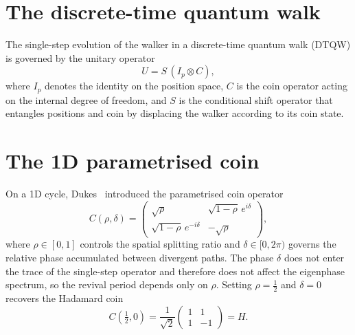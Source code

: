 
\section{The discrete-time quantum walk}
The single-step evolution of the walker in a discrete-time quantum walk
(DTQW) is governed by the unitary operator
\begin{equation}
  U = S\,(I_p \otimes C),
  \label{eq:general-evolution}
\end{equation}
where $I_p$ denotes the identity on the position space, $C$ is the coin
operator acting on the internal degree of freedom, and $S$ is the conditional
shift operator that entangles positions and coin by displacing the walker
according to its coin state.

\section{The 1D parametrised coin}
On a 1D cycle, Dukes~\cite{Dukes2014} introduced the parametrised coin
operator
\begin{equation}
  C(\rho,\delta) =
  \begin{pmatrix}
    \sqrt{\rho} & \sqrt{1-\rho}\,e^{i\delta} \\
    \sqrt{1-\rho}\,e^{-i\delta} & -\sqrt{\rho}
  \end{pmatrix},
  \label{eq:1d-coin}
\end{equation}
where $\rho \in [0,1]$ controls the spatial splitting ratio and
$\delta \in [0, 2\pi)$ governs the relative phase accumulated between
divergent paths. The phase $\delta$ does not enter the trace of the
single-step operator and therefore does not affect the eigenphase
spectrum, so the revival period depends only on $\rho$. Setting
$\rho = \tfrac{1}{2}$ and $\delta = 0$ recovers the Hadamard coin
\begin{equation}
  C\!\left(\tfrac{1}{2}, 0\right) = \frac{1}{\sqrt{2}}
  \begin{pmatrix} 1 & 1 \\ 1 & -1 \end{pmatrix} = H.
  \label{eq:hadamard-coin}
\end{equation}


